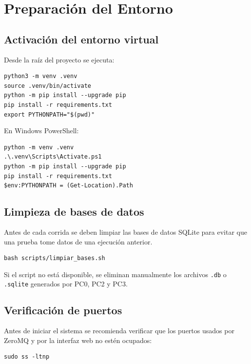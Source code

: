 \documentclass[12pt, a4paper]{article}
\begin{document}
\section{Preparación del Entorno}

\subsection{Activación del entorno virtual}

Desde la raíz del proyecto se ejecuta:

\begin{verbatim}
python3 -m venv .venv
source .venv/bin/activate
python -m pip install --upgrade pip
pip install -r requirements.txt
export PYTHONPATH="$(pwd)"
\end{verbatim}

En Windows PowerShell:

\begin{verbatim}
python -m venv .venv
.\.venv\Scripts\Activate.ps1
python -m pip install --upgrade pip
pip install -r requirements.txt
$env:PYTHONPATH = (Get-Location).Path
\end{verbatim}

\subsection{Limpieza de bases de datos}

Antes de cada corrida se deben limpiar las bases de datos SQLite para evitar que una prueba tome datos de una ejecución anterior.

\begin{verbatim}
bash scripts/limpiar_bases.sh
\end{verbatim}

Si el script no está disponible, se eliminan manualmente los archivos \texttt{.db} o \texttt{.sqlite} generados por PC0, PC2 y PC3.

\subsection{Verificación de puertos}

Antes de iniciar el sistema se recomienda verificar que los puertos usados por ZeroMQ y por la interfaz web no estén ocupados:

\begin{verbatim}
sudo ss -ltnp
\end{verbatim}
\end{document}

